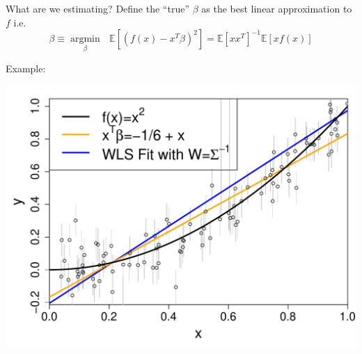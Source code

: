 \documentclass[12pt]{beamer}
\newcommand{\argmin}[1]{\underset{#1}{\operatorname{argmin}}\text{ }}
\newcommand{\E}{\mathbb{E}}
\begin{document}
\begin{frame}{What are we estimating?}
Define the ``true'' $\beta$ as the best linear approximation to $f$ i.e.
  \begin{equation*}
  \beta \equiv \argmin{\beta} \E[(f(x) - x^T\beta)^2] = \E[xx^T]^{-1}\E[xf(x)]
\end{equation*}

Example:

\vspace{-.2in}

\begin{center}
        \includegraphics[scale=0.4]{figs/data.pdf}
  \end{center}


\end{frame}
\end{document}
